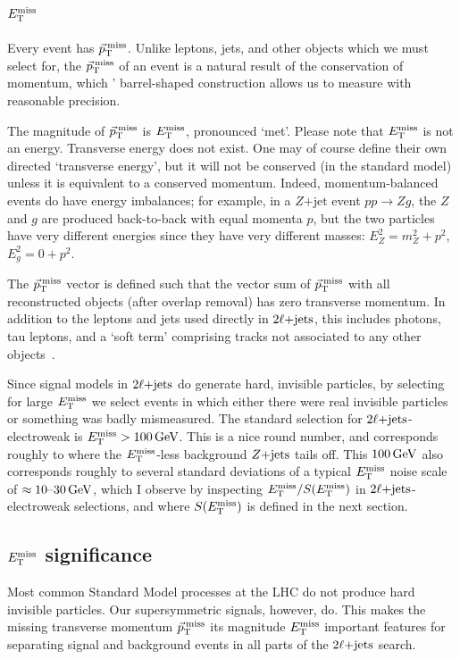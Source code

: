\subsection{$\met$}
Every event has $\ptmiss$.
Unlike leptons, jets, and other objects which we must select for, the $\ptmiss$
of an event is a natural result of the conservation of momentum, which \atlas'
barrel-shaped construction allows us to measure with reasonable precision.

The magnitude of $\ptmiss$ is $\met$, pronounced `met'.
Please note that $\met$ is not an energy.
Transverse energy does not exist.
One may of course define their own directed `transverse energy', but it will
not be conserved (in the standard model) unless it is equivalent to a conserved
momentum.
Indeed, momentum-balanced events do have energy imbalances;
for example, in a $Z\mathrm{+jet}$ event $pp \rightarrow Zg$, the $Z$ and $g$
are produced back-to-back with equal momenta $p$, but the two particles have
very different energies since they have very different masses:
$E_Z^2 = m_Z^2 + p^2$, $E_g^2 = 0 + p^2$.

The $\ptmiss$ vector is defined such that the vector sum of $\ptmiss$ with
all reconstructed objects (after overlap removal) has zero transverse momentum.
In addition to the leptons and jets used directly in $\twoljets$, this includes
photons, tau leptons, and a `soft term' comprising tracks not associated to
any other objects~\cite{atlas_met}.


Since signal models in $\twoljets$ do generate hard, invisible particles,
by selecting for large $\met$ we select events in which either there were real
invisible particles or something was badly mismeasured.
The standard selection for $\twoljets$-electroweak is $\met > 100\,\eV[G]$.
This is a nice round number, and corresponds roughly to where the $\met$-less
background $\zjets$ tails off.
This $100\,\eV[G]$ also corresponds roughly to several standard deviations of
a typical $\met$ noise scale of $\approx 10\textrm{--}30\,\eV[G]$, which I observe
by inspecting $\met / \metsig$ in $\twoljets$-electroweak selections,
and where $\metsig$ is defined in the next section.


\subsection{$\met$ significance}
\label{sec:2ljets_metsig}
Most common Standard Model processes at the LHC do not produce hard
invisible particles.
Our supersymmetric signals, however, do.
This makes the missing transverse momentum $\ptmiss$ its magnitude $\met$
important features for separating signal and background events in all parts
of the $\twoljets$ search.

